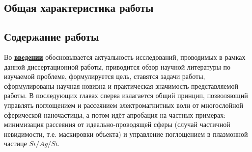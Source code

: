 
\subsection*{Общая характеристика работы}

\newcommand{\actuality}{\underline{\textbf{\actualityTXT}}}
\newcommand{\progress}{\underline{\textbf{\progressTXT}}}
\newcommand{\aim}{\underline{{\textbf\aimTXT}}}
\newcommand{\tasks}{\underline{\textbf{\tasksTXT}}}
\newcommand{\novelty}{\underline{\textbf{\noveltyTXT}}}
\newcommand{\influence}{\underline{\textbf{\influenceTXT}}}
\newcommand{\methods}{\underline{\textbf{\methodsTXT}}}
\newcommand{\defpositions}{\underline{\textbf{\defpositionsTXT}}}
\newcommand{\reliability}{\underline{\textbf{\reliabilityTXT}}}
\newcommand{\probation}{\underline{\textbf{\probationTXT}}}
\newcommand{\contribution}{\underline{\textbf{\contributionTXT}}}
\newcommand{\publications}{\underline{\textbf{\publicationsTXT}}}




\subsection*{Содержание работы}
Во \underline{\textbf{введении}} обосновывается актуальность
исследований, проводимых в рамках данной диссертационной работы,
приводится обзор научной литературы по изучаемой проблеме,
формулируется цель, ставятся задачи работы, сформулированы научная
новизна и практическая значимость представляемой работы. В последующих
главах сперва излагается общий принцип, позволяющий управлять
поглощением и рассеянием электромагнитных волн от многослойной
сферической наночастицы, а потом идёт апробация на частных примерах:
минимизация рассеяния от идеально-проводящей сферы (случай частичной
невидимости, т.е. маскировки объекта) и управление поглощением в плазмонной
частице $Si/Ag/Si$.


